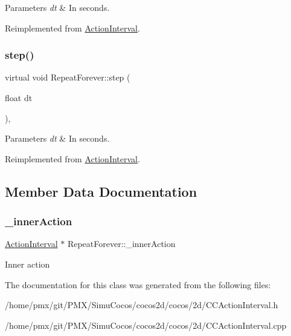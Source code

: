\begin{DoxyParams}{Parameters}
{\em dt} & In seconds. \\
\hline
\end{DoxyParams}


Reimplemented from \hyperlink{classActionInterval_a9a520f0c4bd2d5b92e7f355bccd6f5cf}{Action\+Interval}.

\mbox{\label{classRepeatForever_a102815f01bc0afc0fbcb31840cdb699b}} 
\subsubsection{\texorpdfstring{step()}{step()}\hspace{0.1cm}{\footnotesize\ttfamily [2/2]}}
{\footnotesize\ttfamily virtual void Repeat\+Forever\+::step (\begin{DoxyParamCaption}\item[{float}]{dt }\end{DoxyParamCaption})\hspace{0.3cm}{\ttfamily [override]}, {\ttfamily [virtual]}}


\begin{DoxyParams}{Parameters}
{\em dt} & In seconds. \\
\hline
\end{DoxyParams}


Reimplemented from \hyperlink{classActionInterval_a9a520f0c4bd2d5b92e7f355bccd6f5cf}{Action\+Interval}.



\subsection{Member Data Documentation}
\mbox{\label{classRepeatForever_ae6dc9b3dbad0a71b6610ef0d2aab77c2}} 
\subsubsection{\texorpdfstring{\+\_\+inner\+Action}{\_innerAction}}
{\footnotesize\ttfamily \hyperlink{classActionInterval}{Action\+Interval} $\ast$ Repeat\+Forever\+::\+\_\+inner\+Action\hspace{0.3cm}{\ttfamily [protected]}}

Inner action 

The documentation for this class was generated from the following files\+:\begin{DoxyCompactItemize}
\item 
/home/pmx/git/\+P\+M\+X/\+Simu\+Cocos/cocos2d/cocos/2d/C\+C\+Action\+Interval.\+h\item 
/home/pmx/git/\+P\+M\+X/\+Simu\+Cocos/cocos2d/cocos/2d/C\+C\+Action\+Interval.\+cpp\end{DoxyCompactItemize}
